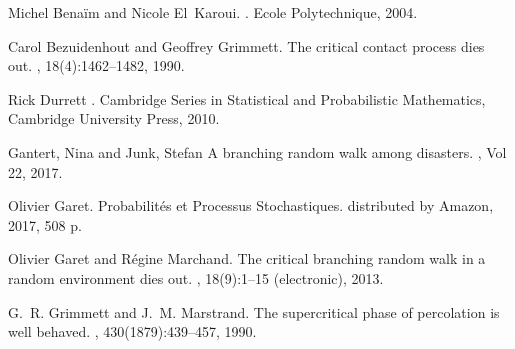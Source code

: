\documentclass[svgnames]{amsart}
\newcommand{\1}{\mathbbo{1}}
\begin{document}
\def\refname{References}

\begin{thebibliography}{1}

Michel Benaïm and Nicole El~Karoui.
.
\newblock Ecole Polytechnique, 2004.

Carol Bezuidenhout and Geoffrey Grimmett.
\newblock The critical contact process dies out.
, 18(4):1462--1482, 1990.

  Rick Durrett
  .
  \newblock Cambridge Series in Statistical and Probabilistic Mathematics,
  \newblock Cambridge University Press, 2010.

  Gantert, Nina and Junk, Stefan
  \newblock A branching random walk among disasters.
  , Vol 22, 2017.
  
  Olivier Garet.
  \newblock Probabilités et Processus Stochastiques.
  \newblock distributed by Amazon, 2017, 508 p.
  
Olivier Garet and R\'egine Marchand.
\newblock The critical branching random walk in a random environment dies out.
, 18(9):1--15 (electronic), 2013.

G.~R. Grimmett and J.~M. Marstrand.
\newblock The supercritical phase of percolation is well behaved.
, 430(1879):439--457, 1990.


\end{thebibliography}
\end{document}
